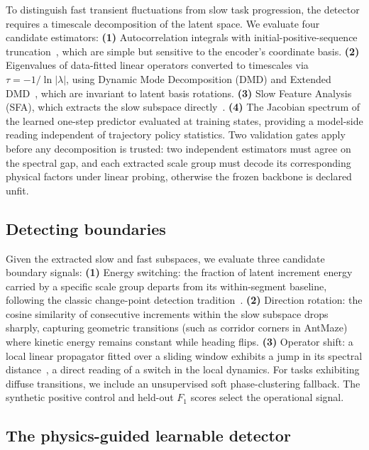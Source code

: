 \documentclass[11pt]{article}
\begin{document}
To distinguish fast transient fluctuations from slow task progression, the detector requires a timescale decomposition of the latent space. We evaluate four candidate estimators: \textbf{(1)} Autocorrelation integrals with initial-positive-sequence truncation~\cite{geyer92}, which are simple but sensitive to the encoder's coordinate basis. \textbf{(2)} Eigenvalues of data-fitted linear operators converted to timescales via $\tau = -1/\ln|\lambda|$, using Dynamic Mode Decomposition (DMD) and Extended DMD~\cite{dmd,koopman_edmd,arbabi17}, which are invariant to latent basis rotations. \textbf{(3)} Slow Feature Analysis (SFA), which extracts the slow subspace directly~\cite{sfa}. \textbf{(4)} The Jacobian spectrum of the learned one-step predictor evaluated at training states, providing a model-side reading independent of trajectory policy statistics. Two validation gates apply before any decomposition is trusted: two independent estimators must agree on the spectral gap, and each extracted scale group must decode its corresponding physical factors under linear probing, otherwise the frozen backbone is declared unfit.

\subsection{Detecting boundaries}

Given the extracted slow and fast subspaces, we evaluate three candidate boundary signals: \textbf{(1)} Energy switching: the fraction of latent increment energy carried by a specific scale group departs from its within-segment baseline, following the classic change-point detection tradition~\cite{page1954cusum,killick2012pelt,adams2007bocpd}. \textbf{(2)} Direction rotation: the cosine similarity of consecutive increments within the slow subspace drops sharply, capturing geometric transitions (such as corridor corners in AntMaze) where kinetic energy remains constant while heading flips. \textbf{(3)} Operator shift: a local linear propagator fitted over a sliding window exhibits a jump in its spectral distance~\cite{dmd,arbabi17}, a direct reading of a switch in the local dynamics. For tasks exhibiting diffuse transitions, we include an unsupervised soft phase-clustering fallback. The synthetic positive control and held-out $F_1$ scores select the operational signal.

\subsection{The physics-guided learnable detector}
\end{document}
